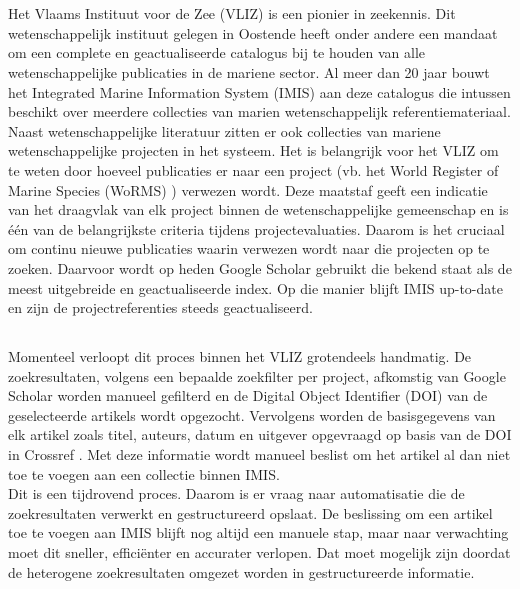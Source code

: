 
\chapter{}%
\label{ch:inleiding}

Het Vlaams Instituut voor de Zee (VLIZ) \autocite{Vliz2024} is een pionier in zeekennis. Dit wetenschappelijk instituut gelegen in Oostende heeft onder andere een mandaat om een complete en geactualiseerde catalogus bij te houden van alle wetenschappelijke publicaties in de mariene sector. Al meer dan 20 jaar bouwt het Integrated Marine Information System (IMIS) aan deze catalogus die intussen beschikt over meerdere collecties van marien wetenschappelijk referentiemateriaal.\\
Naast wetenschappelijke literatuur zitten er ook collecties van mariene wetenschappelijke projecten in het systeem. Het is belangrijk voor het VLIZ om te weten door hoeveel publicaties er naar een project (vb. het World Register of Marine Species (WoRMS) \autocite{Worms2024}) verwezen wordt. Deze maatstaf geeft een indicatie van het draagvlak van elk project binnen de wetenschappelijke gemeenschap en is één van de belangrijkste criteria tijdens projectevaluaties. Daarom is het cruciaal om continu nieuwe publicaties waarin verwezen wordt naar die projecten op te zoeken. Daarvoor wordt op heden Google Scholar gebruikt die bekend staat als de meest uitgebreide en geactualiseerde index. Op die manier blijft IMIS up-to-date en zijn de projectreferenties steeds geactualiseerd.

\section{}%
\label{sec:probleemstelling}

Momenteel verloopt dit proces binnen het VLIZ grotendeels handmatig. De zoekresultaten, volgens een bepaalde zoekfilter per project, afkomstig van Google Scholar worden manueel gefilterd en de Digital Object Identifier (DOI) van de geselecteerde artikels wordt opgezocht.
Vervolgens worden de basisgegevens van elk artikel zoals titel, auteurs, datum en uitgever opgevraagd op basis van de DOI in Crossref \autocite{Crossref2024}. Met deze informatie wordt manueel beslist om het artikel al dan niet toe te voegen aan een collectie binnen IMIS.\\
Dit is een tijdrovend proces. Daarom is er vraag naar automatisatie die de zoekresultaten verwerkt en gestructureerd opslaat. De beslissing om een artikel toe te voegen aan IMIS blijft nog altijd een manuele stap, maar naar verwachting moet dit sneller, efficiënter en accurater verlopen. Dat moet mogelijk zijn doordat de heterogene zoekresultaten omgezet worden in gestructureerde informatie.


